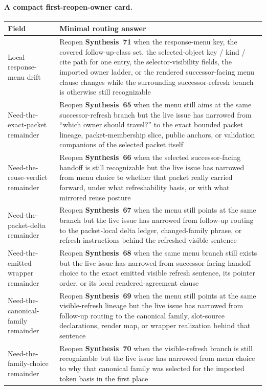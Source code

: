 \documentclass[11pt]{article}
\begin{document}
\clearpage
\paragraph{A compact first-reopen-owner card.}
\begin{center}
\small
\begin{tabularx}{\linewidth}{@{}lX@{}}
\toprule
Field & Minimal routing answer \\
\midrule
Local response-menu drift & Reopen \textbf{Synthesis~71} when the response-menu key, the covered follow-up-class set, the selected-object key / kind / cite path for one entry, the selector-visibility fields, the imported owner ladder, or the rendered successor-facing menu clause changes while the surrounding successor-refresh branch is otherwise still recognizable \\
Need-the-exact-packet remainder & Reopen \textbf{Synthesis~65} when the menu still aims at the same successor-refresh branch but the live issue has narrowed from ``which owner should travel?'' to the exact bounded packet lineage, packet-membership slice, public anchors, or validation companions of the selected packet itself \\
Need-the-reuse-verdict remainder & Reopen \textbf{Synthesis~66} when the selected successor-facing handoff is still recognizable but the live issue has narrowed from menu choice to whether that packet really carried forward, under what refreshability basis, or with what mirrored reuse posture \\
Need-the-packet-delta remainder & Reopen \textbf{Synthesis~67} when the menu still points at the same branch but the live issue has narrowed from follow-up routing to the packet-local delta ledger, changed-family phrase, or refresh instructions behind the refreshed visible sentence \\
Need-the-emitted-wrapper remainder & Reopen \textbf{Synthesis~68} when the same menu branch still exists but the live issue has narrowed from successor-facing handoff choice to the exact emitted visible refresh sentence, its pointer order, or its local rendered-agreement clause \\
Need-the-canonical-family remainder & Reopen \textbf{Synthesis~69} when the menu still points at the same visible-refresh lineage but the live issue has narrowed from follow-up routing to the canonical family, slot-source declarations, render map, or wrapper realization behind that sentence \\
Need-the-family-choice remainder & Reopen \textbf{Synthesis~70} when the visible-refresh branch is still recognizable but the live issue has narrowed from menu choice to why that canonical family was selected for the imported token basis in the first place \\

\end{tabularx}
\end{center}
\end{document}
